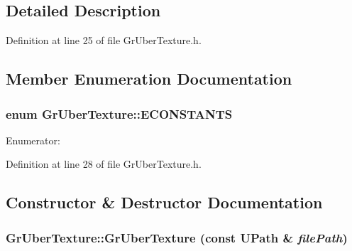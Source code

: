 \begin{CompactItemize}
\subsection{Detailed Description}


Definition at line 25 of file GrUberTexture.h.

\subsection{Member Enumeration Documentation}
\hypertarget{class_gr_uber_texture_cf01f354c19dd4a9b9f75f10a61ea3f7}{
\subsubsection[{ECONSTANTS}]{\setlength{\rightskip}{0pt plus 5cm}enum {\bf GrUberTexture::ECONSTANTS}}}
\label{class_gr_uber_texture_cf01f354c19dd4a9b9f75f10a61ea3f7}


\begin{Desc}
\item[Enumerator: ]\par
\begin{description}
\item[{\em 
\hypertarget{class_gr_uber_texture_cf01f354c19dd4a9b9f75f10a61ea3f76604deb9de1a47ec948a512b8b4ee5f4}{
MAX\_\-ATLAS\_\-WRITES}
\label{class_gr_uber_texture_cf01f354c19dd4a9b9f75f10a61ea3f76604deb9de1a47ec948a512b8b4ee5f4}
}]\end{description}
\end{Desc}



Definition at line 28 of file GrUberTexture.h.

\subsection{Constructor \& Destructor Documentation}
\hypertarget{class_gr_uber_texture_8609b300da5232cf6e8ebdfe7b90aac5}{
\subsubsection[{GrUberTexture}]{\setlength{\rightskip}{0pt plus 5cm}GrUberTexture::GrUberTexture (const {\bf UPath} \& {\em filePath})}}
\label{class_gr_uber_texture_8609b300da5232cf6e8ebdfe7b90aac5}





\end{CompactItemize}
